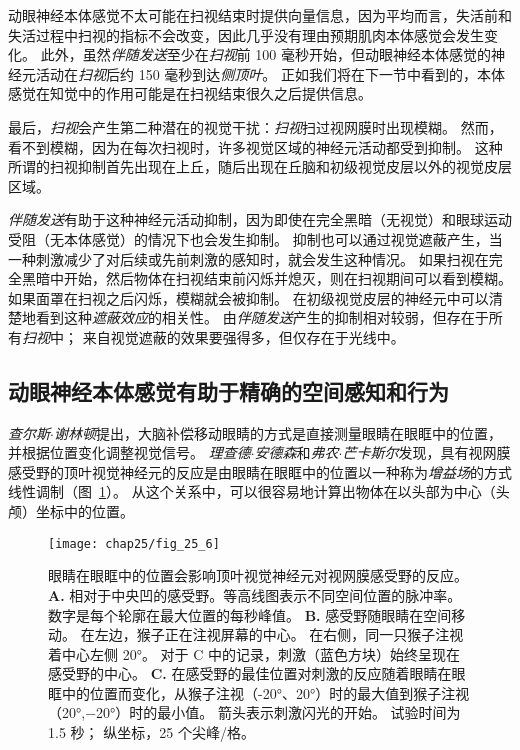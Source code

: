 动眼神经本体感觉不太可能在扫视结束时提供向量信息，因为平均而言，失活前和失活过程中扫视的指标不会改变，因此几乎没有理由预期肌肉本体感觉会发生变化。
此外，虽然\textit{伴随发送}至少在\textit{扫视}前 100 毫秒开始，但动眼神经本体感觉的神经元活动在\textit{扫视}后约 150 毫秒到达\textit{侧顶叶}。
正如我们将在下一节中看到的，本体感觉在知觉中的作用可能是在扫视结束很久之后提供信息。


最后，\textit{扫视}会产生第二种潜在的视觉干扰：\textit{扫视}扫过视网膜时出现模糊。
然而，看不到模糊，因为在每次扫视时，许多视觉区域的神经元活动都受到抑制。
这种所谓的扫视抑制首先出现在上丘，随后出现在丘脑和初级视觉皮层以外的视觉皮层区域。


\textit{伴随发送}有助于这种神经元活动抑制，因为即使在完全黑暗（无视觉）和眼球运动受阻（无本体感觉）的情况下也会发生抑制。
抑制也可以通过视觉遮蔽产生，当一种刺激减少了对后续或先前刺激的感知时，就会发生这种情况。
如果扫视在完全黑暗中开始，然后物体在扫视结束前闪烁并熄灭，则在扫视期间可以看到模糊。
如果面罩在扫视之后闪烁，模糊就会被抑制。
在初级视觉皮层的神经元中可以清楚地看到这种\textit{遮蔽效应}的相关性。
由\textit{伴随发送}产生的抑制相对较弱，但存在于所有\textit{扫视}中；
来自视觉遮蔽的效果要强得多，但仅存在于光线中。



\subsection{动眼神经本体感觉有助于精确的空间感知和行为}

\textit{查尔斯$\cdot$谢林顿}提出，大脑补偿移动眼睛的方式是直接测量眼睛在眼眶中的位置，并根据位置变化调整视觉信号。
\textit{理查德$\cdot$安德森}和\textit{弗农$\cdot$芒卡斯尔}发现，具有视网膜感受野的顶叶视觉神经元的反应是由眼睛在眼眶中的位置以一种称为\textit{增益场}的方式线性调制（图~\ref{fig:25_6}）。
从这个关系中，可以很容易地计算出物体在以头部为中心（头颅）坐标中的位置。


\begin{figure}[htbp]
	\centering
	\texttt{[image: chap25/fig\_25\_6]}
	\caption{眼睛在眼眶中的位置会影响顶叶视觉神经元对视网膜感受野的反应。
		\textbf{A.} 相对于中央凹的感受野。等高线图表示不同空间位置的脉冲率。
		数字是每个轮廓在最大位置的每秒峰值。
		\textbf{B.} 感受野随眼睛在空间移动。
		在左边，猴子正在注视屏幕的中心。
		在右侧，同一只猴子注视着中心左侧 20°。
		对于 C 中的记录，刺激（蓝色方块）始终呈现在感受野的中心。
		\textbf{C.} 在感受野的最佳位置对刺激的反应随着眼睛在眼眶中的位置而变化，从猴子注视（-20°、20°）时的最大值到猴子注视（20°,−20°）时的最小值。
		箭头表示刺激闪光的开始。
		试验时间为 1.5 秒；
		纵坐标，25 个尖峰/格\cite{andersen1985encoding}。}
	\label{fig:25_6}
\end{figure}


